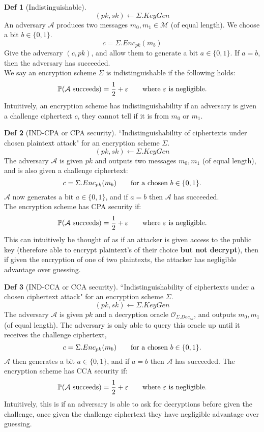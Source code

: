 \documentclass[a4paper, 10pt]{article}
\theoremstyle{definition}
\newtheorem{definition}{Def}[section]
\begin{document}
\begin{definition}[Indistinguishable]
    \[(pk, sk) \leftarrow \Sigma.KeyGen \]
    An adversary $\mathcal{A}$ produces two messages $m_0, m_1 \in \mathcal{M}$ (of equal length).
    We choose a bit $b \in \{0,1\}$.
    \[c = \Sigma .Enc_{pk}(m_b)\] 
    Give the adversary $(c, pk)$, and allow them to generate a bit $a \in \{ 0,1\}$. If $a=b$, then the adversary has succeeded.\\
    We say an encryption scheme $\Sigma$ is indistinguishable if the following holds:
    \[\mathbb{P}(\mathcal{A} \text{ succeeds}) = \frac{1}{2} + \varepsilon \text{\qquad where $\varepsilon $ is negligible.}\] 
    Intuitively, an encryption scheme has indistinguishability if an adversary is given a challenge ciphertext $c$, they cannot tell if it is from $m_0$ or $m_1$.
\end{definition}
\begin{definition}[IND-CPA or CPA security]
    ``Indistinguishability of ciphertexts under chosen plaintext attack" for an encryption scheme $\Sigma $.\\
    \[(pk, sk) \leftarrow \Sigma.KeyGen \]
    The adversary $\mathcal{A} $ is given $pk$ and outputs two messages $m_0, m_1$ (of equal length), and is also given a challenge ciphertext:
    \[c=\Sigma .Enc_{pk}(m_b)\text{\qquad for a chosen }b \in \{ 0,1\}.\] 
    $\mathcal{A}$ now generates a bit $a \in \{ 0,1\}$, and if $a=b$ then $\mathcal{A}$ has succeeded.\\
    The encryption scheme has CPA security if:
    \[\mathbb{P} (\mathcal{A} \text{ succeeds}) = \frac{1}{2} + \varepsilon\text{\qquad where $\varepsilon$ is negligible.}\]
    This can intuitively be thought of as if an attacker is given access to the public key (therefore able to encrypt plaintext's of their choice \textbf{but not decrypt}), then if given the encryption of one of two plaintexts, the attacker has negligible advantage over guessing.
\end{definition}
\begin{definition}[IND-CCA or CCA security]
    ``Indistinguishability of ciphertexts under a chosen ciphertext attack" for an encryption scheme $\Sigma $.\\
    \[(pk, sk) \leftarrow \Sigma.KeyGen \]
    The adversary $\mathcal{A} $ is given $pk$ and a decryption oracle $\mathcal{O}_{\Sigma .Dec_{sk}}$, and outputs $m_0, m_1$ (of equal length). The adversary is only able to query this oracle up until it receives the challenge ciphertext,
    \[c=\Sigma .Enc_{pk}(m_b)\text{\qquad for a chosen }b \in \{ 0,1\}.\] 
    $\mathcal{A} $ then generates a bit $a \in \{ 0, 1\}$, and if $a=b$ then $\mathcal{A} $ has succeeded.
    The encryption scheme has CCA security if:
    \[\mathbb{P} (\mathcal{A} \text{ succeeds}) = \frac{1}{2} + \varepsilon \text{\qquad where $\varepsilon$ is negligible.}\]
    Intuitively, this is if an adversary is able to ask for decryptions before given the challenge, once given the challenge ciphertext they have negligible advantage over guessing.
\end{definition}
\end{document}
